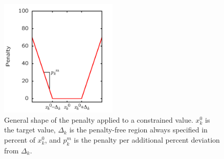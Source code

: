 \documentclass[twoside, 11pt, titlepage, captions=nooneline, a4paper, headsepline]{scrbook}%
\newcommand{\9}{\mathrm}
\newcommand{\0}{\,\mathrm}
\begin{document}
\begin{figure}
\centering
\includegraphics[width=0.5\textwidth]{Figures/PenaltyFunction.png}
\caption{General shape of the penalty applied to a constrained value. $x_k^0$ is the target value, $\Delta_k$ is the penalty-free region always specified in percent of $x_k^0$, and $p_k^m$ is the penalty per additional percent deviation from $\Delta_k$.}
\label{figPenaltyFunction}
\end{figure}
\end{document}
